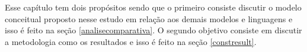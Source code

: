 Esse capítulo tem dois propósitos sendo que o primeiro consiste discutir o modelo conceitual proposto nesse estudo em relação aos demais modelos e linguagens e isso é feito na seção  \ref{analisecomparativa}. O segundo objetivo consiste em discutir a metodologia como os resultados e isso é feito na seção \ref{constresult}.